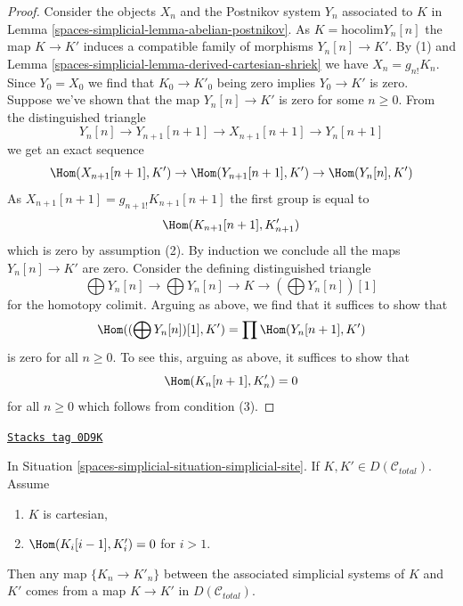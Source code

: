 \begin{proof}
Consider the objects $X_n$ and the Postnikov system $Y_n$
associated to $K$ in Lemma \ref{spaces-simplicial-lemma-abelian-postnikov}.
As $K = \text{hocolim} Y_n[n]$ the map $K \to K'$ induces
a compatible family of morphisms $Y_n[n] \to K'$.
By (1) and Lemma \ref{spaces-simplicial-lemma-derived-cartesian-shriek} we have
$X_n = g_{n!}K_n$. Since $Y_0 = X_0$ we find that
$K_0 \to K'_0$ being zero implies $Y_0 \to K'$ is zero.
Suppose we've shown that the map $Y_n[n] \to K'$ is zero
for some $n \geq 0$. From the distinguished triangle
$$
Y_n[n] \to Y_{n + 1}[n + 1] \to X_{n + 1}[n + 1] \to Y_n[n + 1]
$$
we get an exact sequence
$$
\Hom(X_{n + 1}[n + 1], K') \to
\Hom(Y_{n + 1}[n + 1], K') \to
\Hom(Y_n[n], K')
$$
As $X_{n + 1}[n + 1] = g_{n + 1!}K_{n + 1}[n + 1]$ the first group is equal to
$$
\Hom(K_{n + 1}[n + 1], K'_{n + 1})
$$
which is zero by assumption (2). By induction we conclude all the maps
$Y_n[n] \to K'$ are zero. Consider the defining distinguished triangle
$$
\bigoplus Y_n[n] \to
\bigoplus Y_n[n] \to
K \to
(\bigoplus Y_n[n])[1]
$$
for the homotopy colimit. Arguing as above, we find that it suffices
to show that
$$
\Hom((\bigoplus Y_n[n])[1], K') = \prod \Hom(Y_n[n + 1], K')
$$
is zero for all $n \geq 0$. To see this, arguing as above,
it suffices to show that
$$
\Hom(K_n[n + 1], K'_n)  = 0
$$
for all $n \geq 0$ which follows from condition (3).
\end{proof}

\begin{lemma}
\label{spaces-simplicial-lemma-hom-cartesian-objects-derived}
\href{https://stacks.math.columbia.edu/tag/0D9K}{\texttt{Stacks tag 0D9K}}

In Situation \ref{spaces-simplicial-situation-simplicial-site}.
If $K, K' \in D(\mathcal{C}_{total})$.
Assume
\begin{enumerate}
\item $K$ is cartesian,
\item $\Hom(K_i[i - 1], K'_i) = 0$ for $i > 1$.
\end{enumerate}
Then any map $\{K_n \to K'_n\}$ between the associated simplicial systems
of $K$ and $K'$ comes from a map $K \to K'$ in $D(\mathcal{C}_{total})$.
\end{lemma}

